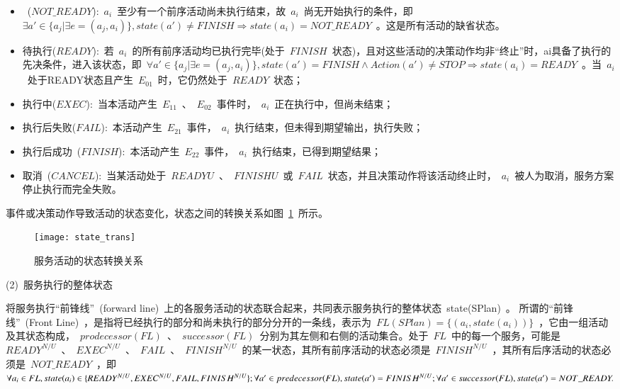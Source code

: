 \begin{itemize}

\item ~($NOT\_READY$):~$a_i$~至少有一个前序活动尚未执行结束，故~$a_i$~尚无开始执行的条件，即~$\exists a' \in \{ {a_j}|\exists e = ( {{a_j},{a_i}} )\} ,state ( {a'} ) \ne FINISH \Rightarrow state ( {{a_i}} ) = NOT\_READY$~。这是所有活动的缺省状态。

\item 待执行($READY$):~若~$a_i$~的所有前序活动均已执行完毕(处于~$FINISH$~状态)，且对这些活动的决策动作均非“终止”时，ai具备了执行的先决条件，进入该状态，即~$\forall a' \in \{ {a_j}|\exists e = ( {{a_j},{a_i}} )\} ,state ( {a'} ) = FINISH \wedge Action(a') \ne STOP \Rightarrow state ( {{a_i}} ) = READY$~。当~$a_i$~处于READY状态且产生~$E_{01}$~时，它仍然处于~$READY$~状态；

\item 执行中($EXEC$):~当本活动产生~$E_{11}$~、~$E_{02}$~事件时，~$a_i$~正在执行中，但尚未结束；

\item 执行后失败($FAIL$):~本活动产生~$E_{21}$~事件，~$a_i$~执行结束，但未得到期望输出，执行失败；

\item 执行后成功~($FINISH$):~本活动产生~$E_{22}$~事件，~$a_i$~执行结束，已得到期望结果；

\item 取消~($CANCEL$):~当某活动处于~$READYU$~、~$FINISHU$~或~$FAIL$~状态，并且决策动作将该活动终止时，~$a_i$~被人为取消，服务方案停止执行而完全失败。
\end{itemize}

事件或决策动作导致活动的状态变化，状态之间的转换关系如图~\ref{figure:state_trans}~所示。
\begin{figure}[htbp]
    \centering
    \texttt{[image: state\_trans]}
    \caption{服务活动的状态转换关系}\label{figure:state_trans}
    \vspace{-1em}
\end{figure}

(2)~服务执行的整体状态

将服务执行“前锋线”~(forward line)~上的各服务活动的状态联合起来，共同表示服务执行的整体状态~state(SPlan)~。
所谓的“前锋线”~(Front Line)~，是指将已经执行的部分和尚未执行的部分分开的一条线，表示为~$FL(SPlan)=\{(a_i, state(a_i))\}$~，它由一组活动及其状态构成，~$prodecessor(FL)$~、~$successor(FL)$~分别为其左侧和右侧的活动集合。处于~$FL$~中的每一个服务，可能是~$READY^{N/U}$~、~$EXEC^{N/U}$~、~$FAIL$~、~$FINISH^{N/U}$~的某一状态，其所有前序活动的状态必须是~$FINISH^{N/U}$~，其所有后序活动的状态必须是~$NOT\_READY$~，即
$\forall {a_i} \in FL,state({a_i}) \in \{ READ{Y^{N/U}},{\rm{ }}EXE{C^{N/U}},{\rm{ }}FAIL,{\rm{ }}FINIS{H^{N/U}}\} ;\forall a' \in predecessor(FL),state(a') = FINIS{H^{N/U}};\forall a' \in successor(FL),state(a') = NOT\_READY.$


